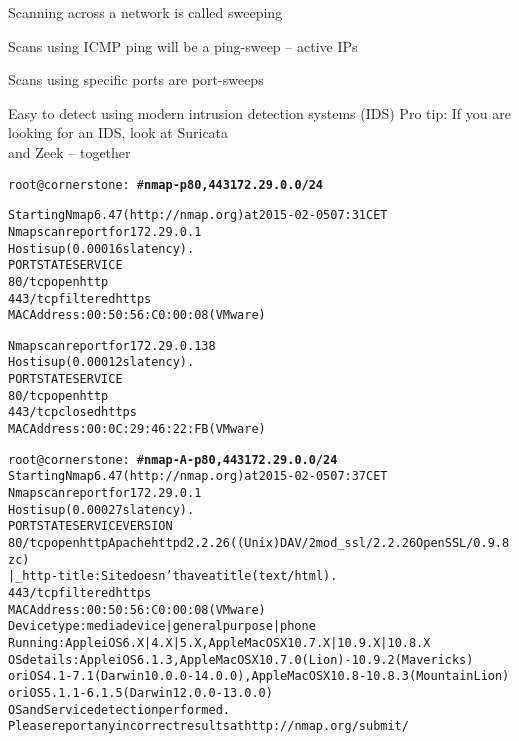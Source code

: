 \documentclass[Screen16to9,17pt]{foils}
\begin{document}

\begin{list1}
\item Scanning across a network is called sweeping
\item Scans using ICMP ping will be a ping-sweep -- active IPs
\item Scans using specific ports are port-sweeps
\item Easy to detect using modern intrusion detection systems (IDS)
\vskip 2cm
Pro tip: If you are looking for an IDS, look at Suricata \\
and Zeek  -- together
\end{list1}


\begin{alltt}\small
root@cornerstone:~#{\bf  nmap -p80,443 172.29.0.0/24}

Starting Nmap 6.47 ( http://nmap.org ) at 2015-02-05 07:31 CET
Nmap scan report for 172.29.0.1
Host is up (0.00016s latency).
PORT    STATE    SERVICE
{\color{darkgreen}80/tcp  open     http}
443/tcp filtered https
MAC Address: 00:50:56:C0:00:08 (VMware)

Nmap scan report for 172.29.0.138
Host is up (0.00012s latency).
PORT    STATE  SERVICE
{\color{darkgreen}80/tcp  open   http}
443/tcp closed https
MAC Address: 00:0C:29:46:22:FB (VMware)

\end{alltt}



\begin{alltt}\footnotesize
root@cornerstone:~#{\bf nmap -A -p80,443 172.29.0.0/24}
Starting Nmap 6.47 ( http://nmap.org ) at 2015-02-05 07:37 CET
Nmap scan report for 172.29.0.1
Host is up (0.00027s latency).
PORT    STATE    SERVICE VERSION
80/tcp  open     http    Apache httpd 2.2.26 ((Unix) DAV/2 mod_ssl/2.2.26 OpenSSL/0.9.8zc)
|_http-title: Site doesn't have a title (text/html).
443/tcp filtered https
MAC Address: 00:50:56:C0:00:08 (VMware)
Device type: media device|general purpose|phone
Running: Apple iOS 6.X|4.X|5.X, Apple Mac OS X 10.7.X|10.9.X|10.8.X
OS details: Apple iOS 6.1.3, Apple Mac OS X 10.7.0 (Lion) - 10.9.2 (Mavericks)
or iOS 4.1 - 7.1 (Darwin 10.0.0 - 14.0.0), Apple Mac OS X 10.8 - 10.8.3 (Mountain Lion)
or iOS 5.1.1 - 6.1.5 (Darwin 12.0.0 - 13.0.0)
OS and Service detection performed.
Please report any incorrect results at http://nmap.org/submit/
\end{alltt}
\end{document}
